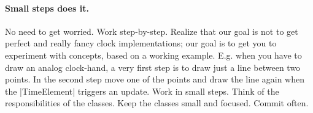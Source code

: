 \begin{multicols}{2}
\paragraph{Small steps does it.} No need to get worried. Work
step-by-step. Realize that our goal is not to get perfect and really fancy clock 
implementations; our goal is to get you to experiment with concepts, based on a 
working example. E.g. when you have to draw an analog clock-hand, 
a very first step is to draw just a line between two points. In the
second step move one of the points and draw the line again when the
|TimeElement| triggers an update. Work in small steps. Think of the
responsibilities of the classes. Keep the classes small and focused. Commit often.
\end{multicols}


